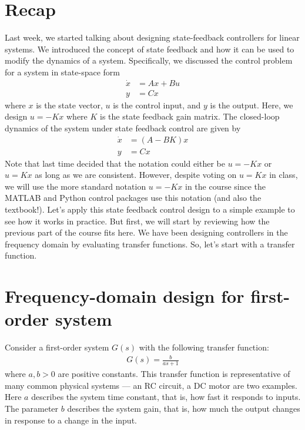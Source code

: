 \documentclass{ee122_notes}
\begin{document}
\section{Recap}
Last week, we started talking about designing state-feedback controllers for linear systems. We introduced the concept of state feedback and how it can be used to modify the dynamics of a system. Specifically, we discussed the control problem for a system in state-space form
\begin{align*}
    \dot x &= Ax + Bu \\
    y &= Cx
\end{align*}
where $x$ is the state vector, $u$ is the control input, and $y$ is the output. Here, we design $u = -Kx$ where $K$ is the state feedback gain matrix. The closed-loop dynamics of the system under state feedback control are given by
\begin{align*}
    \dot x &= (A - BK)x \\
    y &= Cx
\end{align*}
Note that last time decided that the notation could either be $u = -Kx$ or $u = Kx$ as long as we are consistent. However, despite voting on $u = Kx$ in class, we will use the more standard notation $u = -Kx$ in the course since the MATLAB and Python control packages use this notation (and also the textbook!). Let's apply this state feedback control design to a simple example to see how it works in practice. But first, we will start by reviewing how the previous part of the course fits here. We have been designing controllers in the frequency domain by evaluating transfer functions. So, let's start with a transfer function.
\section{Frequency-domain design for first-order system}
Consider a first-order system $G(s)$ with the following transfer function:
\begin{align*}
    G(s) = \frac{b}{as + 1}
\end{align*}
where $a, b > 0$ are positive constants.
This transfer function is representative of many common physical systems --- an RC circuit, a DC motor are two examples. Here $a$ describes the system time constant, that is, how fast it responds to inputs. The parameter $b$ describes the system gain, that is, how much the output changes in response to a change in the input. 
\end{document}

